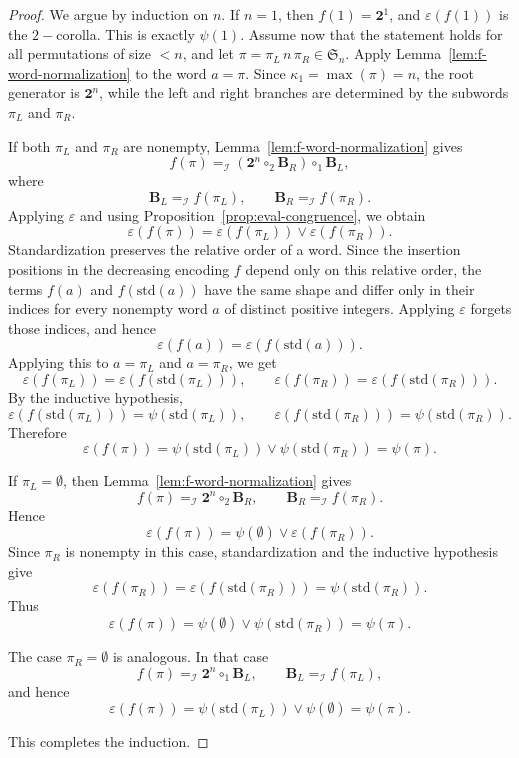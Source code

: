 \documentclass[a4paper]{article}
\theoremstyle{plain}
\theoremstyle{definition}
\theoremstyle{remark}
\numberwithin{equation}{section}
\newcommand{\Sym}{\mathfrak{S}}
\newcommand{\std}{\mathrm{std}}
\newcommand{\eval}{\varepsilon}
\begin{document}
\begin{proof}
We argue by induction on \(n\). If \(n=1\), then \(f(1)=\mathbf 2^1\), and
\(\eval(f(1))\) is the $2-$corolla. This is exactly \(\psi(1)\). Assume now that the statement holds for all permutations of size \(<n\), and let $\pi=\pi_L\,n\,\pi_R\in\Sym_n$. Apply Lemma~\ref{lem:f-word-normalization} to the word \(a=\pi\). Since
\(\kappa_1=\max(\pi)=n\), the root generator is \(\mathbf 2^n\), while the left
and right branches are determined by the subwords \(\pi_L\) and \(\pi_R\).

If both \(\pi_L\) and \(\pi_R\) are nonempty, Lemma~\ref{lem:f-word-normalization}
gives
\[
f(\pi)=_{\mathcal I}(\mathbf 2^n\circ_2 \mathbf B_R)\circ_1 \mathbf B_L,
\]
where
\[
\mathbf B_L =_{\mathcal I} f(\pi_L),
\qquad
\mathbf B_R =_{\mathcal I} f(\pi_R).
\]
Applying \(\eval\) and using Proposition~\ref{prop:eval-congruence}, we obtain
\[
\eval(f(\pi))
=
\eval(f(\pi_L))\vee \eval(f(\pi_R)).
\]
Standardization preserves the relative order of a word. Since the insertion
positions in the decreasing encoding \(f\) depend only on this relative order,
the terms \(f(a)\) and \(f(\std(a))\) have the same shape and differ only in
their indices for every nonempty word \(a\) of distinct positive integers.
Applying \(\eval\) forgets those indices, and hence
\[
\eval(f(a))=\eval(f(\std(a))).
\]
Applying this to \(a=\pi_L\) and \(a=\pi_R\), we get
\[
\eval(f(\pi_L))=\eval(f(\std(\pi_L))),
\qquad
\eval(f(\pi_R))=\eval(f(\std(\pi_R))).
\]
By the inductive hypothesis,
\[
\eval(f(\std(\pi_L)))=\psi(\std(\pi_L)),
\qquad
\eval(f(\std(\pi_R)))=\psi(\std(\pi_R)).
\]
Therefore
\[
\eval(f(\pi))
=
\psi(\std(\pi_L))\vee \psi(\std(\pi_R))
=
\psi(\pi).
\]

If \(\pi_L=\emptyset\), then Lemma~\ref{lem:f-word-normalization} gives
\[
f(\pi)=_{\mathcal I}\mathbf 2^n\circ_2 \mathbf B_R,
\qquad
\mathbf B_R=_{\mathcal I}f(\pi_R).
\]
Hence
\[
\eval(f(\pi))
=
\psi(\emptyset)\vee \eval(f(\pi_R)).
\]
Since \(\pi_R\) is nonempty in this case, standardization and the inductive
hypothesis give
\[
\eval(f(\pi_R))
=
\eval(f(\std(\pi_R)))
=
\psi(\std(\pi_R)).
\]
Thus
\[
\eval(f(\pi))
=
\psi(\emptyset)\vee\psi(\std(\pi_R))
=
\psi(\pi).
\]

The case \(\pi_R=\emptyset\) is analogous. In that case
\[
f(\pi)=_{\mathcal I}\mathbf 2^n\circ_1 \mathbf B_L,
\qquad
\mathbf B_L=_{\mathcal I}f(\pi_L),
\]
and hence
\[
\eval(f(\pi))
=
\psi(\std(\pi_L))\vee\psi(\emptyset)
=
\psi(\pi).
\]

This completes the induction.
\end{proof}
\end{document}
